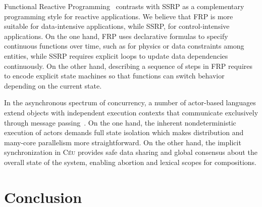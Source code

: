 \documentclass[preprint]{sigplanconf}
\newcommand{\CEU}{\textsc{C\'{e}u}\xspace}
\newcommand{\1}{\;}
\newcommand{\2}{\;\;}
\newcommand{\3}{\;\;\;}
\newcommand{\5}{\;\;\;\;\;}
\begin{document}
Functional Reactive Programming~\cite{frp.principles} contrasts with SSRP as a
complementary programming style for reactive applications.
%
We believe that FRP is more suitable for data-intensive applications, while 
SSRP, for control-intensive applications.
%
On the one hand, FRP uses declarative formulas to specify continuous functions 
over time, such as for physics or data constraints among entities, while SSRP 
requires explicit loops to update data dependencies continuously.
%
On the other hand, describing a sequence of steps in FRP requires to encode 
explicit state machines so that functions can switch behavior depending on the 
current state.

In the asynchronous spectrum of concurrency, a number of actor-based languages 
extend objects with independent execution contexts that communicate exclusively 
through message 
passing~\cite{agha.salsa,actors.thorn,actors.jcobox,actors.capsule}.
%
On the one hand, the inherent nondeterministic execution of actors demands full 
state isolation which makes distribution and many-core parallelism more 
straightforward.
%
On the other hand, the implicit synchronization in \CEU provides safe data 
sharing and global consensus about the overall state of the system, enabling 
abortion and lexical scopes for compositions.

\section{Conclusion}
\label{sec.conclusion}
\end{document}
